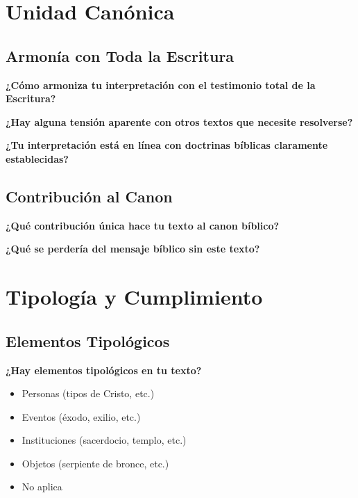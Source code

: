 \documentclass[11pt,a4paper]{article}
\begin{document}
\section{Unidad Canónica}

\subsection{Armonía con Toda la Escritura}

\textbf{¿Cómo armoniza tu interpretación con el testimonio total de la Escritura?}
\vspace{3cm}

\textbf{¿Hay alguna tensión aparente con otros textos que necesite resolverse?}
\vspace{3cm}

\textbf{¿Tu interpretación está en línea con doctrinas bíblicas claramente establecidas?}
\vspace{2cm}

\subsection{Contribución al Canon}

\textbf{¿Qué contribución única hace tu texto al canon bíblico?}
\vspace{3cm}

\textbf{¿Qué se perdería del mensaje bíblico sin este texto?}
\vspace{3cm}

\newpage

\section{Tipología y Cumplimiento}

\subsection{Elementos Tipológicos}

\textbf{¿Hay elementos tipológicos en tu texto?}
\begin{itemize}[leftmargin=1cm]
    \item[$\square$] Personas (tipos de Cristo, etc.)
    \item[$\square$] Eventos (éxodo, exilio, etc.)
    \item[$\square$] Instituciones (sacerdocio, templo, etc.)
    \item[$\square$] Objetos (serpiente de bronce, etc.)
    \item[$\square$] No aplica
\end{itemize}
\end{document}
